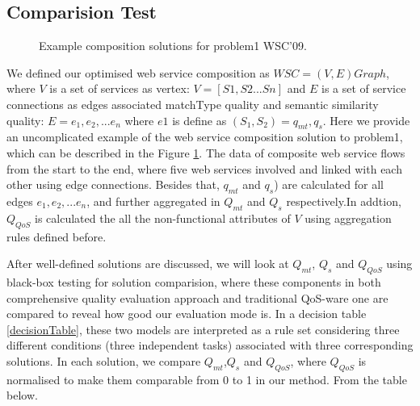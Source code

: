 \documentclass{llncs}
\begin{document}
\subsection{Comparision Test}\label{comparisionTest}
\begin{figure}[h]
\centerline{
}
 \caption{Example composition solutions for problem1 WSC'09.}
 \label{wscs}
\end{figure}
We defined our optimised web service composition as $WSC = (V, E)Graph$, where $V$ is a set of services as vertex: $V=[S1, S2...Sn]$ and $E$ is a set of service connections as edges associated matchType quality and semantic similarity quality: $E = {e_{1}, e_{2},... e_{n}}$ where $e1$ is define as $(S_{1},S_{2})={q_{mt}, q_{s}}$. Here we provide an uncomplicated example of the web service composition solution to problem1, which can be described in the Figure \ref{wscs}. The data of composite web service flows from the start to the end, where five web services involved and linked with each other using edge connections. Besides that, $q_{mt}$ and $q_{s}$) are calculated for all edges ${e_{1}, e_{2},... e_{n}}$, and further aggregated in $Q_{mt}$ and $Q_{s}$ respectively.In addtion, $Q_{QoS}$ is calculated the all the non-functional attributes of $V$ using aggregation rules defined before.

After well-defined solutions are discussed, we will look at $Q_{mt}$, $Q_{s}$ and $Q_{QoS}$ using  black-box testing for solution comparision, where these components in both comprehensive quality evaluation approach and traditional QoS-ware one \cite{feng2013dynamic,huang2009effective,ma2015hybrid,da2014graph} are compared to reveal how good our evaluation mode is. In a decision table \ref{decisionTable}, these two models are interpreted as a rule set considering three different conditions (three independent tasks) associated with three corresponding solutions. In each solution, we compare $Q_{mt}$,$Q_{s}$ and $Q_{QoS}$, where $Q_{QoS}$ is normalised to make them comparable from 0 to 1 in our method. From the table below.
\end{document}
